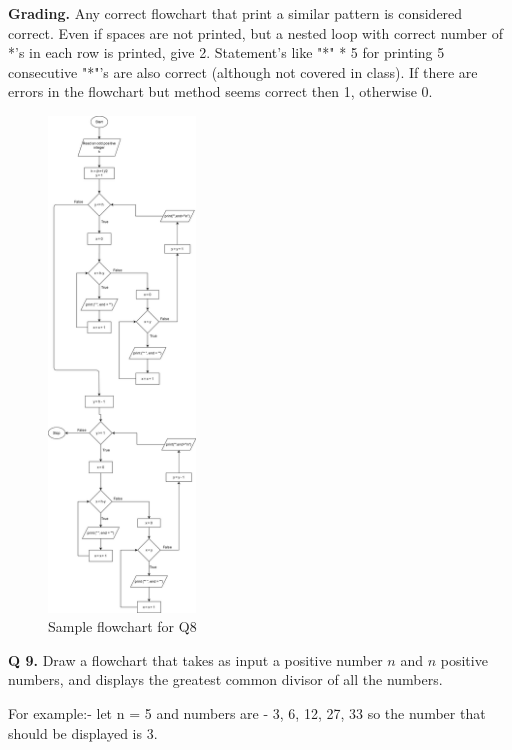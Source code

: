 \documentclass{article}
\begin{document}
    \begin{flushleft}
    
    \textbf{Grading. } Any correct flowchart that print a similar pattern is 
    considered correct. Even if spaces are not printed, but a nested loop with
    correct number of *'s in each row is printed, give 2. Statement's like 
    "*" * 5 for printing 5 consecutive "*"'s are also correct (although not 
    covered in class). If there are errors in the flowchart but method seems 
    correct then 1, otherwise 0.
    
    \end{flushleft}
    
    \begin{figure}[ht]
        \centering
        \includegraphics[width=0.35\textwidth]{Q8.png}
        \caption{Sample flowchart for Q8}
        \label{Q8}
    \end{figure}

\clearpage



\begin{flushleft}

    \textbf{Q 9. } Draw a flowchart that takes as input a positive number $n$ and 
    $n$ positive numbers, and displays the greatest common divisor of all the 
    numbers.

    For example:-  let n = 5 and numbers are - 3, 6, 12, 27, 33 so the 
    number that should be displayed is 3.  
    
    \end{flushleft}
    
\end{document}
